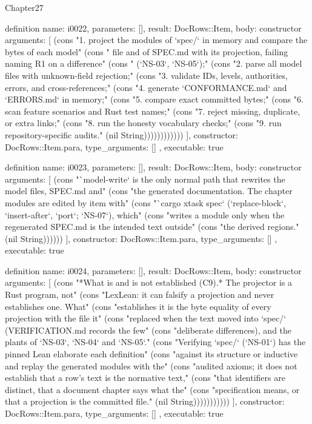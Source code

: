 \begin{lexlean}{Chapter27}
\begin{semanticmodule}
definition{
  name: i0022,
  parameters: [],
  result: DocRows::Item,
  body: constructor{
    arguments: [
      (cons "1. project the modules of `spec/` in memory and compare the bytes of each model" (cons "   file and of SPEC.md with its projection, failing naming R1 on a difference" (cons "   (`NS-03`, `NS-05`);" (cons "2. parse all model files with unknown-field rejection;" (cons "3. validate IDs, levels, authorities, errors, and cross-references;" (cons "4. generate `CONFORMANCE.md` and `ERRORS.md` in memory;" (cons "5. compare exact committed bytes;" (cons "6. scan feature scenarios and Rust test names;" (cons "7. reject missing, duplicate, or extra links;" (cons "8. run the honesty vocabulary checks;" (cons "9. run repository-specific audits." (nil String))))))))))))
    ],
    constructor: DocRows::Item.para,
    type_arguments: []
  },
  executable: true
}

definition{
  name: i0023,
  parameters: [],
  result: DocRows::Item,
  body: constructor{
    arguments: [
      (cons "`model-write` is the only normal path that rewrites the model files, SPEC.md and" (cons "the generated documentation. The chapter modules are edited by item with" (cons "`cargo xtask spec` (`replace-block`, `insert-after`, `port`; `NS-07`), which" (cons "writes a module only when the regenerated SPEC.md is the intended text outside" (cons "the derived regions." (nil String))))))
    ],
    constructor: DocRows::Item.para,
    type_arguments: []
  },
  executable: true
}

definition{
  name: i0024,
  parameters: [],
  result: DocRows::Item,
  body: constructor{
    arguments: [
      (cons "*What is and is not established (C9).* The projector is a Rust program, not" (cons "LexLean: it can falsify a projection and never establishes one. What" (cons "establishes it is the byte equality of every projection with the file it" (cons "replaced when the text moved into `spec/` (VERIFICATION.md records the few" (cons "deliberate differences), and the plants of `NS-03`, `NS-04` and `NS-05`." (cons "Verifying `spec/` (`NS-01`) has the pinned Lean elaborate each definition" (cons "against its structure or inductive and replay the generated modules with the" (cons "audited axioms; it does not establish that a row's text is the normative text," (cons "that identifiers are distinct, that a document chapter says what the" (cons "specification means, or that a projection is the committed file." (nil String)))))))))))
    ],
    constructor: DocRows::Item.para,
    type_arguments: []
  },
  executable: true
}


\end{semanticmodule}
\end{lexlean}
